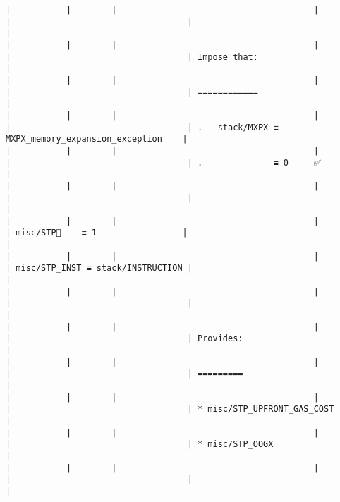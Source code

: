 \documentclass[varwidth=\maxdimen,margin=0.5cm,multi={verbatim}]{standalone}
\begin{document}
\begin{verbatim}
|           |        |                                       |                                 |                                   |                                                     |
|           |        |                                       |                                 |                                   | Impose that:                                        |
|           |        |                                       |                                 |                                   | ============                                        |
|           |        |                                       |                                 |                                   | .   stack/MXPX ≡ MXPX_memory_expansion_exception    |
|           |        |                                       |                                 |                                   | .              ≡ 0     ✅                           |
|           |        |                                       |                                 |                                   |                                                     |
|           |        |                                       |                                 | misc/STP🚩    ≡ 1                 |                                                     |
|           |        |                                       |                                 | misc/STP_INST ≡ stack/INSTRUCTION |                                                     |
|           |        |                                       |                                 |                                   |                                                     |
|           |        |                                       |                                 |                                   | Provides:                                           |
|           |        |                                       |                                 |                                   | =========                                           |
|           |        |                                       |                                 |                                   | * misc/STP_UPFRONT_GAS_COST                         |
|           |        |                                       |                                 |                                   | * misc/STP_OOGX                                     |
|           |        |                                       |                                 |                                   |                                                     |

\end{verbatim}
\end{document}
